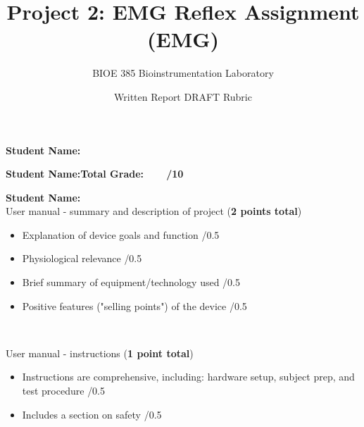 \documentclass{article}
\title{Project 2: EMG Reflex Assignment (EMG)}
\author{BIOE 385 Bioinstrumentation Laboratory}
\date{Written Report DRAFT Rubric}
\begin{document}
\large
\maketitle

\textbf{Student Name:}\vspace{0.5cm}

\textbf{Student Name:}\hfill 	\textbf{Total Grade:\ \ \ \ \underline{\hspace{1cm}}/10}\vspace{0.5cm}

\textbf{Student Name:}\hfill\\

User manual - summary and description of project (\textbf{2 points total})
\begin{small}
\begin{itemize}
	\item Explanation of device goals and function \hfill \underline{\hspace{1cm}}/0.5
	\item Physiological relevance \hfill \underline{\hspace{1cm}}/0.5
	\item Brief summary of equipment/technology used \hfill \underline{\hspace{1cm}}/0.5
	\item Positive features ("selling points") of the device \hfill \underline{\hspace{1cm}}/0.5
\end{itemize}
\end{small}\

User manual - instructions (\textbf{1 point total})
\begin{small}
\begin{itemize}
	\item Instructions are comprehensive, including: hardware setup, subject prep, and test procedure \hfill \underline{\hspace{1cm}}/0.5
	\item Includes a section on safety \hfill \underline{\hspace{1cm}}/0.5
\end{itemize}
\end{small}\
\end{document}
